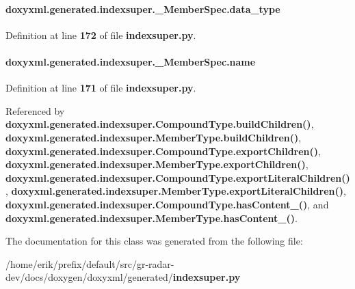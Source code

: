 \paragraph[{data\+\_\+type}]{\setlength{\rightskip}{0pt plus 5cm}doxyxml.\+generated.\+indexsuper.\+\_\+\+Member\+Spec.\+data\+\_\+type}\label{classdoxyxml_1_1generated_1_1indexsuper_1_1__MemberSpec_a6410ad8d4bf8fcbf203ec8e2e1947b52}


Definition at line {\bf 172} of file {\bf indexsuper.\+py}.

\paragraph[{name}]{\setlength{\rightskip}{0pt plus 5cm}doxyxml.\+generated.\+indexsuper.\+\_\+\+Member\+Spec.\+name}\label{classdoxyxml_1_1generated_1_1indexsuper_1_1__MemberSpec_a7eeb7959761bd26a20ae71b285a81c4d}


Definition at line {\bf 171} of file {\bf indexsuper.\+py}.



Referenced by {\bf doxyxml.\+generated.\+indexsuper.\+Compound\+Type.\+build\+Children()}, {\bf doxyxml.\+generated.\+indexsuper.\+Member\+Type.\+build\+Children()}, {\bf doxyxml.\+generated.\+indexsuper.\+Compound\+Type.\+export\+Children()}, {\bf doxyxml.\+generated.\+indexsuper.\+Member\+Type.\+export\+Children()}, {\bf doxyxml.\+generated.\+indexsuper.\+Compound\+Type.\+export\+Literal\+Children()}, {\bf doxyxml.\+generated.\+indexsuper.\+Member\+Type.\+export\+Literal\+Children()}, {\bf doxyxml.\+generated.\+indexsuper.\+Compound\+Type.\+has\+Content\+\_\+()}, and {\bf doxyxml.\+generated.\+indexsuper.\+Member\+Type.\+has\+Content\+\_\+()}.



The documentation for this class was generated from the following file\+:\begin{DoxyCompactItemize}
\item 
/home/erik/prefix/default/src/gr-\/radar-\/dev/docs/doxygen/doxyxml/generated/{\bf indexsuper.\+py}\end{DoxyCompactItemize}
